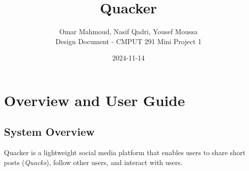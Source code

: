 \documentclass[letterpaper, 11pt]{article}
\begin{document}
\title{\huge Quacker}
\author{Omar Mahmoud,  Nasif Qadri,  Yousef Moussa\\[0.5cm] 
Design Document - CMPUT 291 Mini Project 1\\}
\date{2024-11-14}

\maketitle


\section{Overview and User Guide}

\subsection{System Overview}
Quacker is a lightweight social media platform that enables users to share short posts (\textit{Quacks}), follow other users, and interact with users. 
\end{document}
